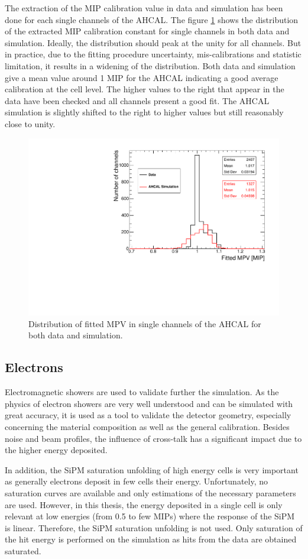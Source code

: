 The extraction of the MIP calibration value in data and simulation has been done for each single channels of the AHCAL. The figure \ref{fig:MPVData_MC} shows the distribution of the extracted MIP calibration constant for single channels in both data and simulation. Ideally, the distribution should peak at the unity for all channels. But in practice, due to the fitting procedure uncertainty, mis-calibrations and statistic limitation, it results in a widening of the distribution. Both data and simulation give a mean value around 1 MIP for the AHCAL indicating a good average calibration at the cell level. The higher values to the right that appear in the data have been checked and all channels present a good fit. The AHCAL simulation is slightly shifted to the right to higher values but still reasonably close to unity.

\begin{figure}[htbp!]
	\centering
	\includegraphics[width=0.5\linewidth]{../Thesis_Plots/EnergyCalib/Plots/ComparisonMCData_MPV.pdf}
	\caption{Distribution of fitted MPV in single channels of the AHCAL for both data and simulation.} \label{fig:MPVData_MC}
\end{figure}

\subsection{Electrons}

Electromagnetic showers are used to validate further the simulation. As the physics of electron showers are very well understood and can be simulated with great accuracy, it is used as a tool to validate the detector geometry, especially concerning the material composition as well as the general calibration. Besides noise and beam profiles, the influence of cross-talk has a significant impact due to the higher energy deposited.

In addition, the SiPM saturation unfolding of high energy cells is very important as generally electrons deposit in few cells their energy. Unfortunately, no saturation curves are available and only estimations of the necessary parameters are used. However, in this thesis, the energy deposited in a single cell is only relevant at low energies (from 0.5 to few MIPs) where the response of the SiPM is linear. Therefore, the SiPM saturation unfolding is not used. Only saturation of the hit energy is performed on the simulation as hits from the data are obtained saturated.

